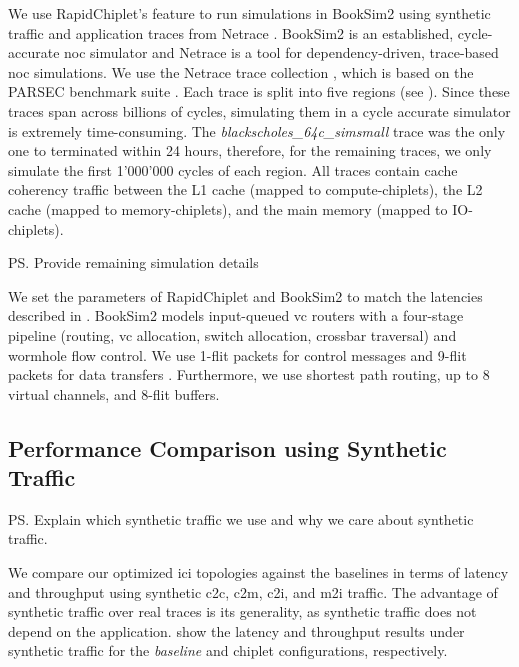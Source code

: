 We use RapidChiplet's \cite{rapidchiplet} feature to run simulations in BookSim2 \cite{booksim} using synthetic traffic and application traces from Netrace \cite{netrace}.
BookSim2 is an established, cycle-accurate \gls{noc} simulator and Netrace is a tool for dependency-driven, trace-based \gls{noc} simulations. 
We use the Netrace trace collection \cite{netrace-traces}, which is based on the PARSEC benchmark suite \cite{parsec}.
Each trace is split into five regions (see ).
Since these traces span across billions of cycles, simulating them in a cycle accurate simulator is extremely time-consuming. 
The \textit{blackscholes\_64c\_simsmall} trace was the only one to terminated within 24 hours, therefore, for the remaining traces, we only simulate the first 1'000'000 cycles of each region.
All traces contain cache coherency traffic between the L1 cache (mapped to compute-chiplets), the L2 cache (mapped to memory-chiplets), and the main memory (mapped to IO-chiplets).






\ps{Provide remaining simulation details}

We set the parameters of RapidChiplet and BookSim2 to match the latencies described in . 
BookSim2 models input-queued \gls{vc} routers with a four-stage pipeline (routing, \gls{vc} allocation, switch allocation, crossbar traversal) and wormhole flow control.
We use 1-flit packets for control messages and 9-flit packets for data transfers \cite{netrace-tr}.
Furthermore, we use shortest path routing, up to 8 virtual channels, and 8-flit buffers.




\subsection{Performance Comparison using Synthetic Traffic}
\label{ssec:eval-synthetic}

\ps{Explain which synthetic traffic we use and why we care about synthetic traffic.}

We compare our optimized \gls{ici} topologies against the baselines in terms of latency and throughput using synthetic \gls{c2c}, \gls{c2m}, \gls{c2i}, and \gls{m2i} traffic.
The advantage of synthetic traffic over real traces is its generality, as synthetic traffic does not depend on the application.
 show the latency and throughput results under synthetic traffic for the \textit{baseline} and  \textit{\name} chiplet configurations, respectively.

